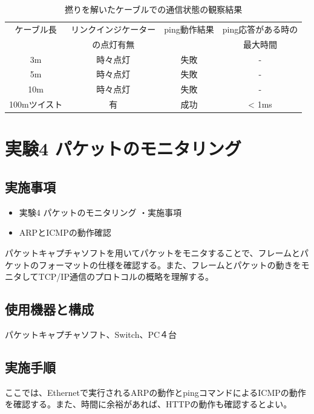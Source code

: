 \documentclass[10pt]{article}
\begin{document}
\begingroup
        \setlength{\tabcolsep}{5pt} %
        \renewcommand{\arraystretch}{1.5} %
        \begin{table}[H]
        \centering
    	\caption{撚りを解いたケーブルでの通信状態の観察結果}
    	\begin{tabular}{|c|c|c|c|}
    	    \hline
    	    ケーブル長 &  リンクインジケーター  & ping動作結果 & ping応答がある時の\\
    	    & の点灯有無 & & 最大時間\\ [0.5ex] 
    		\hline\hline
    			3m & 時々点灯 & 失敗 & - \\ \hline
    			5m & 時々点灯 & 失敗 & -\\ \hline
    			10m & 時々点灯 & 失敗 & -\\ \hline
            	100mツイスト & 有 & 成功 & < 1ms\\ \hline
                
    	\end{tabular}
    \end{table} 
\endgroup

\pagebreak

\section{実験4 パケットのモニタリング}

\subsection{実施事項}

\begin{itemize}
    \item 実験4  パケットのモニタリング ・実施事項 　
    \item ARPとICMPの動作確認
\end{itemize}
パケットキャプチャソフトを用いてパケットをモニタすることで、フレームとパケットのフォーマットの仕様を確認する。また、フレームとパケットの動きをモニタしてTCP/IP通信のプロトコルの概略を理解する。

\subsection{使用機器と構成}
パケットキャプチャソフト、Switch、PC４台

\subsection{実施手順}
ここでは、Ethernetで実行されるARPの動作とpingコマンドによるICMPの動作を確認する。また、時間に余裕があれば、HTTPの動作も確認するとよい。
\end{document}
